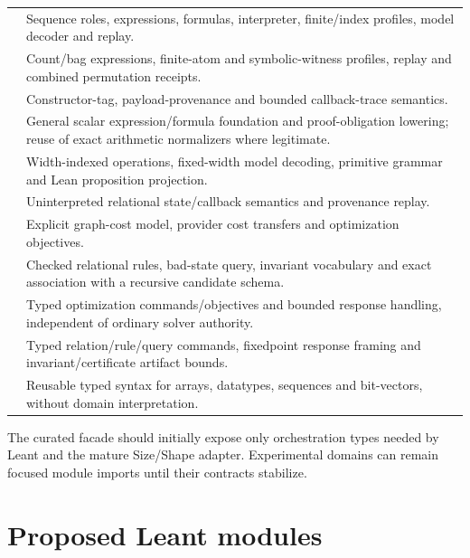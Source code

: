 \documentclass[11pt,oneside]{report}
\begin{document}
\begin{longtable}{@{}L{0.43\textwidth}L{0.51\textwidth}@{}}
 & Sequence roles, expressions, formulas, interpreter, finite/index profiles, model decoder and replay. \\
 & Count/bag expressions, finite-atom and symbolic-witness profiles, replay and combined permutation receipts. \\
 & Constructor-tag, payload-provenance and bounded callback-trace semantics. \\
 & General scalar expression/formula foundation and proof-obligation lowering; reuse of exact arithmetic normalizers where legitimate. \\
 & Width-indexed operations, fixed-width model decoding, primitive grammar and Lean proposition projection. \\
 & Uninterpreted relational state/callback semantics and provenance replay. \\
 & Explicit graph-cost model, provider cost transfers and optimization objectives. \\
 & Checked relational rules, bad-state query, invariant vocabulary and exact association with a recursive candidate schema. \\
 & Typed optimization commands/objectives and bounded response handling, independent of ordinary solver authority. \\
 & Typed relation/rule/query commands, fixedpoint response framing and invariant/certificate artifact bounds. \\
 & Reusable typed syntax for arrays, datatypes, sequences and bit-vectors, without domain interpretation. \\
\end{longtable}

The curated  facade should initially expose only orchestration types needed by Leant and the mature Size/Shape adapter. Experimental domains can remain focused module imports until their contracts stabilize.

\section{Proposed Leant modules}
\end{document}
